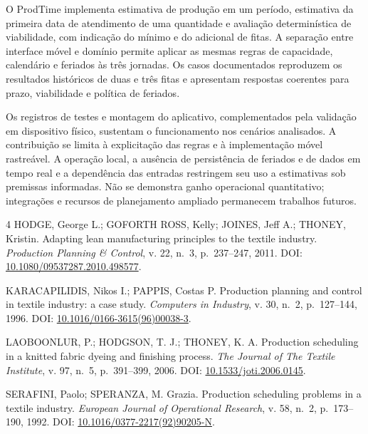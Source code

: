 \documentclass[12pt]{article}
\begin{document}
O ProdTime implementa estimativa de produção em um período, estimativa da primeira data de atendimento de uma quantidade e avaliação determinística de viabilidade, com indicação do mínimo e do adicional de fitas. A separação entre interface móvel e domínio permite aplicar as mesmas regras de capacidade, calendário e feriados às três jornadas. Os casos documentados reproduzem os resultados históricos de duas e três fitas e apresentam respostas coerentes para prazo, viabilidade e política de feriados.

Os registros de testes e montagem do aplicativo, complementados pela validação em dispositivo físico, sustentam o funcionamento nos cenários analisados. A contribuição se limita à explicitação das regras e à implementação móvel rastreável. A operação local, a ausência de persistência de feriados e de dados em tempo real e a dependência das entradas restringem seu uso a estimativas sob premissas informadas. Não se demonstra ganho operacional quantitativo; integrações e recursos de planejamento ampliado permanecem trabalhos futuros.
\makeatletter
\renewcommand{\@biblabel}[1]{}
\makeatother
\begin{thebibliography}{4}
HODGE, George L.; GOFORTH ROSS, Kelly; JOINES, Jeff A.; THONEY, Kristin. Adapting lean manufacturing principles to the textile industry. \emph{Production Planning \& Control}, v. 22, n.~3, p.~237--247, 2011. DOI: \href{https://doi.org/10.1080/09537287.2010.498577}{10.1080/09537287.2010.498577}.

KARACAPILIDIS, Nikos I.; PAPPIS, Costas P. Production planning and control in textile industry: a case study. \emph{Computers in Industry}, v. 30, n.~2, p.~127--144, 1996. DOI: \href{https://doi.org/10.1016/0166-3615(96)00038-3}{10.1016/0166-3615(96)00038-3}.

LAOBOONLUR, P.; HODGSON, T. J.; THONEY, K. A. Production scheduling in a knitted fabric dyeing and finishing process. \emph{The Journal of The Textile Institute}, v. 97, n.~5, p.~391--399, 2006. DOI: \href{https://doi.org/10.1533/joti.2006.0145}{10.1533/joti.2006.0145}.

SERAFINI, Paolo; SPERANZA, M. Grazia. Production scheduling problems in a textile industry. \emph{European Journal of Operational Research}, v. 58, n.~2, p.~173--190, 1992. DOI: \href{https://doi.org/10.1016/0377-2217(92)90205-N}{10.1016/0377-2217(92)90205-N}.
\end{thebibliography}
\end{document}
